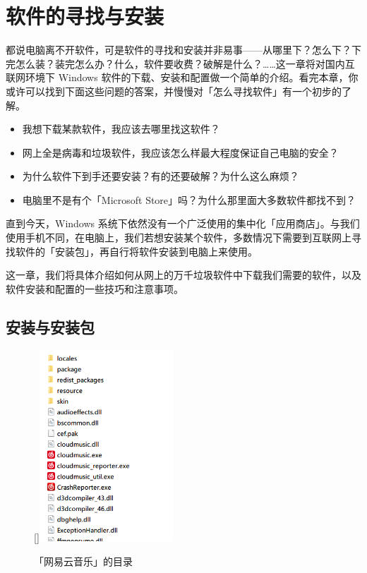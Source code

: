 \chapter{软件的寻找与安装}
\label{cha:software-installation}

\begin{intro}
  都说电脑离不开软件，可是软件的寻找和安装并非易事——从哪里下？怎么下？下完怎么装？装完怎么办？什么，软件要收费？破解是什么？……这一章将对国内互联网环境下 Windows 软件的下载、安装和配置做一个简单的介绍。看完本章，你或许可以找到下面这些问题的答案，并慢慢对「怎么寻找软件」有一个初步的了解。
  \begin{itemize}
    \item 我想下载某款软件，我应该去哪里找这软件？
    \item 网上全是病毒和垃圾软件，我应该怎么样最大程度保证自己电脑的安全？
    \item 为什么软件下到手还要安装？有的还要破解？为什么这么麻烦？
    \item 电脑里不是有个「Microsoft Store」吗？为什么那里面大多数软件都找不到？
  \end{itemize}
\end{intro}

直到今天，Windows 系统下依然没有一个广泛使用的集中化「应用商店」。与我们使用手机不同，在电脑上，我们若想安装某个软件，多数情况下需要到互联网上寻找软件的「安装包」，再自行将软件安装到电脑上来使用。

这一章，我们将具体介绍如何从网上的万千垃圾软件中下载我们需要的软件，以及软件安装和配置的一些技巧和注意事项。\vspace*{-.5cm}

\section{安装与安装包}

\begin{figure}
  \centering
  \raisebox{0pt}[\dimexpr{}\baselineskip\relax]{\includegraphics[width=5cm]{assets/basic/NCM_directory.png}}
  \caption{「网易云音乐」的目录}
  \label{fig:NCM_directory2}
\end{figure}

